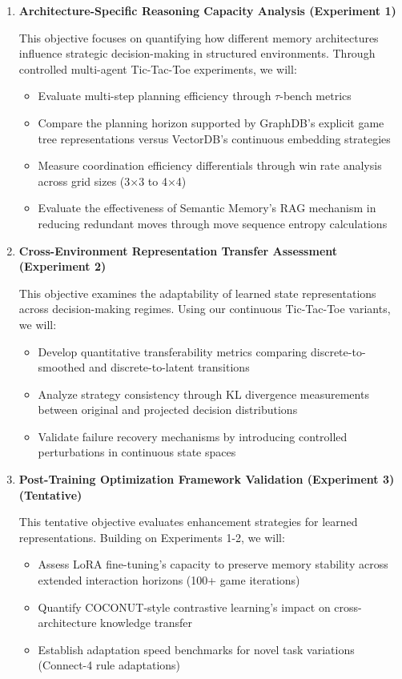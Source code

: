 \documentclass[11pt]{article}
\begin{document}
\begin{enumerate}
    \item \textbf{Architecture-Specific Reasoning Capacity Analysis (Experiment 1)}
    
    This objective focuses on quantifying how different memory architectures influence strategic decision-making in structured environments. Through controlled multi-agent Tic-Tac-Toe experiments, we will:
    
    \begin{itemize}
        \item Evaluate multi-step planning efficiency through $\tau$-bench metrics
        \item Compare the planning horizon supported by GraphDB's explicit game tree representations versus VectorDB's continuous embedding strategies
        \item Measure coordination efficiency differentials through win rate analysis across grid sizes (3×3 to 4×4)
        \item Evaluate the effectiveness of Semantic Memory's RAG mechanism in reducing redundant moves through move sequence entropy calculations
    \end{itemize}

    \item \textbf{Cross-Environment Representation Transfer Assessment (Experiment 2)}
    
    This objective examines the adaptability of learned state representations across decision-making regimes. Using our continuous Tic-Tac-Toe variants, we will:
    
    \begin{itemize}
        \item Develop quantitative transferability metrics comparing discrete-to-smoothed and discrete-to-latent transitions
        \item Analyze strategy consistency through KL divergence measurements between original and projected decision distributions
        \item Validate failure recovery mechanisms by introducing controlled perturbations in continuous state spaces
    \end{itemize}

    \item \textbf{Post-Training Optimization Framework Validation (Experiment 3) (Tentative)}
    
    This tentative objective evaluates enhancement strategies for learned representations. Building on Experiments 1-2, we will:
    
    \begin{itemize}
        \item Assess LoRA fine-tuning's capacity to preserve memory stability across extended interaction horizons (100+ game iterations)
        \item Quantify COCONUT-style contrastive learning's impact on cross-architecture knowledge transfer
        \item Establish adaptation speed benchmarks for novel task variations (Connect-4 rule adaptations)
    \end{itemize}
\end{enumerate}
\end{document}
